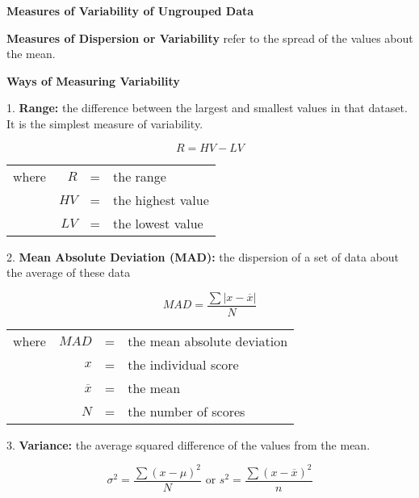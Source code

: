 \begin{center}
\textbf{Measures of Variability of Ungrouped Data}
\end{center}

\vspace*{1ex}

\textbf{Measures of Dispersion or Variability} refer to the spread  of the values  about the mean. 

\textbf{Ways of Measuring Variability}

1. \textbf{Range:} the difference between the largest and smallest values in that dataset. It is the simplest measure of variability. 

$$ R = HV - LV $$

\begin{center}
\begin{tabular}{rrcl}

where & $R$ & = & the range\\

& $HV$ & = &the highest value\\

& $LV$ & = & the lowest value\\

\end{tabular} 
\end{center} 


2. \textbf{Mean Absolute Deviation (MAD):} the dispersion of a set of data about the average of these data 

$$ MAD = \dfrac{\sum | x - \overline{x}|}{N} $$

\begin{center}
\begin{tabular}{rrcl}

where & $MAD$ & = & the mean absolute deviation \\
& $x$ & = & the individual score \\
& $\overline{x} $ & = & the mean\\

& $N$ & = & the number of scores\\

\end{tabular} 
\end{center} 


3. \textbf{Variance: } the average squared difference of the values from the mean. 

$$ \sigma^2 = \dfrac{\sum (x - \mu)^2 }{N} \text{ or } s^2 = \dfrac{\sum (x - \overline{x})^2 }{n} $$

